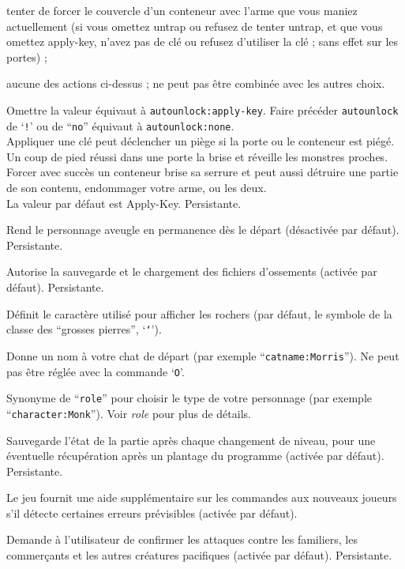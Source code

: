 \documentclass[titlepage]{article}
\begin{document}
\begin{description}[font=\mdseries\itshape]
\begin{description}[leftmargin=\auwidth, topsep=1mm, itemsep=0mm, labelwidth=*, font=\ttfamily, align=right]
tenter de forcer le couvercle d'un conteneur avec l'arme que vous maniez
actuellement (si vous omettez untrap ou refusez de tenter untrap, et que
vous omettez apply-key, n'avez pas de clé ou refusez d'utiliser la clé ;
sans effet sur les portes) ;
\item[None]
aucune des actions ci-dessus ; ne peut pas être combinée avec les autres choix.
\end{description}
Omettre la valeur équivaut à \texttt{autounlock:apply-key}.
Faire précéder \texttt{autounlock} de `\texttt{!}' ou de ``\texttt{no}'' équivaut à
\texttt{autounlock:none}.
\\
Appliquer une clé peut déclencher un piège si la porte ou le conteneur est piégé.
Un coup de pied réussi dans une porte la brise et réveille les monstres proches.
Forcer avec succès un conteneur brise sa serrure et peut aussi
détruire une partie de son contenu, endommager votre arme, ou les deux.
\\
La valeur par défaut est Apply-Key.
Persistante.
\item[blind]
Rend le personnage aveugle en permanence dès le départ (désactivée par défaut). Persistante.
\item[bones]
Autorise la sauvegarde et le chargement des fichiers d'ossements (activée par défaut). Persistante.
\item[boulder]
Définit le caractère utilisé pour afficher les rochers (par défaut, le symbole de la
classe des ``grosses pierres'', `\texttt{`}').
\item[catname]
Donne un nom à votre chat de départ (par exemple ``\texttt{catname:Morris}'').
Ne peut pas être réglée avec la commande `\texttt{O}'.
\item[character]
Synonyme de ``\texttt{role}'' pour choisir le type de votre personnage
(par exemple ``\texttt{character:Monk}''). Voir \textit{role} pour plus de détails.
\item[checkpoint]
Sauvegarde l'état de la partie après chaque changement de niveau, pour une éventuelle
récupération après un plantage du programme (activée par défaut). Persistante.
\item[cmdassist]
Le jeu fournit une aide supplémentaire sur les commandes aux nouveaux
joueurs s'il détecte certaines erreurs prévisibles (activée par défaut).
\item[confirm]
Demande à l'utilisateur de confirmer les attaques contre les familiers, les commerçants et les autres
créatures pacifiques (activée par défaut). Persistante.

\end{description}
\end{document}
